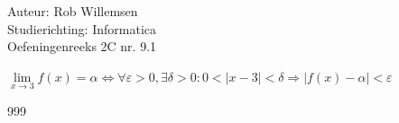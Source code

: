 \documentclass[a4paper]{article}
\begin{document}
\noindent \large Auteur: Rob Willemsen \\
\noindent \large Studierichting: Informatica\\
\noindent \large Oefeningenreeks 2C nr. 9.1\\

\medskip

\normalsize

$\lim\limits_{x \rightarrow 3} f(x) = \alpha \Leftrightarrow \forall \varepsilon > 0, \exists \delta > 0 : 0 < |x - 3| < \delta \Rightarrow |f(x) - \alpha| < \varepsilon$ \\

\begin{thebibliography}{999}
\end{thebibliography}
\end{document}
